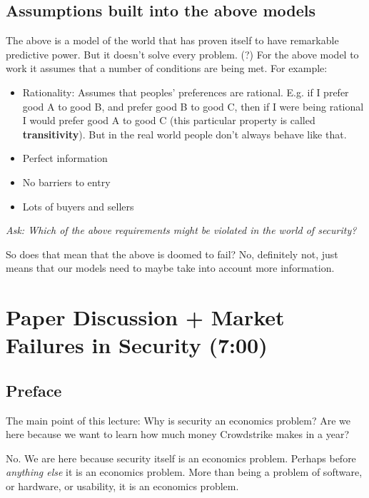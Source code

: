 \documentclass[11pt]{article}
\begin{document}
\subsection{Assumptions built into the above models}

The above is a model of the world that has proven itself to have remarkable predictive power.
But it doesn't solve every problem. (?)
For the above model to work it assumes that a number of conditions are being met. For example:

\begin{itemize}
    \item Rationality: Assumes that peoples' preferences are rational. E.g. if I prefer good A to good B, and prefer good B to good C, then if I were being rational I would prefer good A to good C (this particular property is called {\bf transitivity}). But in the real world people don't always behave like that.
    \item Perfect information
    \item No barriers to entry
    \item Lots of buyers and sellers
\end{itemize}


{\it Ask: Which of the above requirements might be violated in the world of security?}


So does that mean that the above is doomed to fail? No, definitely not, just means that our models need to maybe take into account more information.




\section{Paper Discussion + Market Failures in Security (7:00)}


\subsection{Preface}

The main point of this lecture: Why is security an economics problem? Are we here because we want to learn how much money Crowdstrike makes in a year?

No. We are here because security itself is an economics problem. Perhaps before \textit{anything else} it is an economics problem. More than being a problem of software, or hardware, or usability, it is an economics problem.
\end{document}
